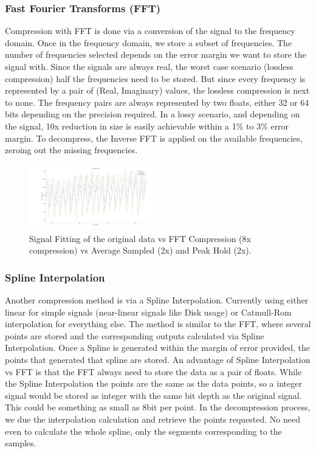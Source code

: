 \documentclass[conference]{IEEEtran}
\begin{document}
\vspace{10pt}
\subsubsection{Fast Fourier Transforms (FFT)}

Compression with FFT is done via a conversion of the signal to the frequency domain. Once in the frequency domain, we store a subset of frequencies.
The number of frequencies selected depends on the error margin we want to store the signal with. Since the signals are always real, the worst case scenario (lossless compression) half the frequencies need to be stored.
But since every frequency is represented by a pair of (Real, Imaginary) values, the lossless compression is next to none. 
The frequency pairs are always represented by two floats, either 32 or 64 bits depending on the precision required.
In a lossy scenario, and depending on the signal, 10x reduction in size is easily achievable within a 1\% to 3\% error margin.
To decompress, the Inverse FFT is applied on the available frequencies, zeroing out the missing frequencies.

\begin{figure}[ht]
  \centering
  \includegraphics[width=0.5\textwidth]{FFT_Comparison.png}
  \caption{Signal Fitting of the original data vs FFT Compression (8x compression) vs Average Sampled (2x) and Peak Hold (2x).}
  \label{Fig.3}
\end{figure}
\vspace{5pt}

\subsubsection{Spline Interpolation}

Another compression method is via a Spline Interpolation. Currently using either linear for simple signals (near-linear signals like Disk usage) or Catmull-Rom interpolation for everything else.
The method is similar to the FFT, where several points are stored and the corresponding outputs calculated via Spline Interpolation.
Once a Spline is generated within the margin of error provided, the points that generated that spline are stored.
An advantage of Spline Interpolation vs FFT is that the FFT always need to store the data as a pair of floats. 
While the Spline Interpolation the points are the same as the data points, so a integer signal would be stored as integer with the same bit depth as the original signal.
This could be something as small as 8bit per point.
In the decompression process, we due the interpolation calculation and retrieve the points requested.
No need even to calculate the whole spline, only the segments corresponding to the samples.
\end{document}
